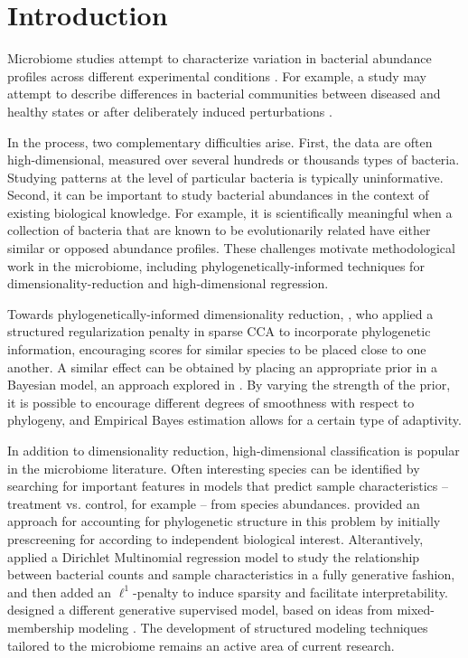 \documentclass[oupdraft]{bio}
\begin{document}
\section{Introduction}

Microbiome studies attempt to characterize variation in bacterial abundance
profiles across different experimental conditions \citep{human2012structure}.
For example, a study may attempt to describe differences in bacterial
communities between diseased and healthy states or after deliberately induced
perturbations \citep{dethlefsen2011incomplete}.

In the process, two complementary difficulties arise. First, the data are often
high-dimensional, measured over several hundreds or thousands types of bacteria.
Studying patterns at the level of particular bacteria is typically
uninformative. Second, it can be important to study bacterial abundances in the
context of existing biological knowledge. For example, it is scientifically
meaningful when a collection of bacteria that are known to be evolutionarily
related have either similar or opposed abundance profiles. These challenges
motivate methodological work in the microbiome, including
phylogenetically-informed techniques for dimensionality-reduction and
high-dimensional regression.

Towards phylogenetically-informed dimensionality reduction,
\cite{chen2013structure}, who applied a structured regularization penalty in
sparse CCA to incorporate phylogenetic information, encouraging scores for
similar species to be placed close to one another. A similar effect can be
obtained by placing an appropriate prior in a Bayesian model, an approach
explored in \cite{fukuyama2017adaptive}. By varying the strength of the prior,
it is possible to encourage different degrees of smoothness with respect to
phylogeny, and Empirical Bayes estimation allows for a certain type of
adaptivity.

In addition to dimensionality reduction, high-dimensional classification is
popular in the microbiome literature. Often interesting species can be
identified by searching for important features in models that predict sample
characteristics -- treatment vs. control, for example -- from species
abundances. \cite{segata2011metagenomic} provided an approach for accounting for
phylogenetic structure in this problem by initially prescreening for according
to independent biological interest. Alterantively, \cite{chen2013variable}
applied a Dirichlet Multinomial regression model to study the relationship
between bacterial counts and sample characteristics in a fully generative
fashion, and then added an $\ell^{1}$-penalty to induce sparsity and facilitate
interpretability. \cite{shafiei2015biomico} designed a different generative
supervised model, based on ideas from mixed-membership modeling
\citep{blei2003latent}. The development of structured modeling techniques
tailored to the microbiome remains an active area of current research.
\end{document}
